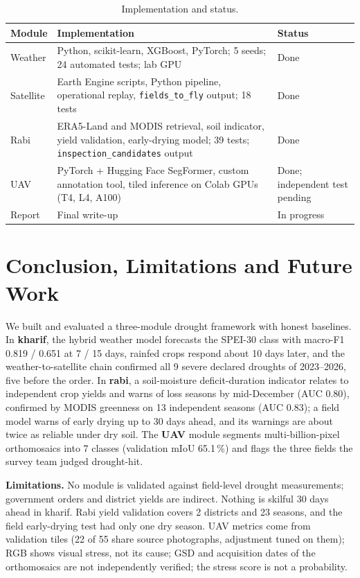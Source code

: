 \documentclass[11pt,a4paper,oneside]{article}
\newcommand{\mf}{macro-F1}
\begin{document}
\begin{table}[!htbp]
\centering
\caption{Implementation and status.}
\label{tab:status}
\scriptsize
\begin{tabularx}{\textwidth}{@{}p{2.6cm}Yp{1.6cm}@{}}
\toprule
\textbf{Module} & \textbf{Implementation} & \textbf{Status} \\
\midrule
Weather & Python, scikit-learn, XGBoost, PyTorch; 5 seeds; 24 automated tests; lab GPU & Done \\
Satellite & Earth Engine scripts, Python pipeline, operational replay, \texttt{fields\_to\_fly} output; 18 tests & Done \\
Rabi & ERA5-Land and MODIS retrieval, soil indicator, yield validation, early-drying model; 39 tests; \texttt{inspection\_candidates} output & Done \\
UAV & PyTorch + Hugging Face SegFormer, custom annotation tool, tiled inference on Colab GPUs (T4, L4, A100) & Done; independent test pending \\
Report & Final write-up & In progress \\
\bottomrule
\end{tabularx}
\end{table}

\section{Conclusion, Limitations and Future Work}
We built and evaluated a three-module drought framework with honest baselines. In \textbf{kharif}, the hybrid weather model forecasts the SPEI-30 class with \mf{} 0.819 / 0.651 at 7 / 15 days, rainfed crops respond about 10 days later, and the weather-to-satellite chain confirmed all 9 severe declared droughts of 2023--2026, five before the order. In \textbf{rabi}, a soil-moisture deficit-duration indicator relates to independent crop yields and warns of loss seasons by mid-December (AUC 0.80), confirmed by MODIS greenness on 13 independent seasons (AUC 0.83); a field model warns of early drying up to 30 days ahead, and its warnings are about twice as reliable under dry soil. The \textbf{UAV} module segments multi-billion-pixel orthomosaics into 7 classes (validation mIoU 65.1\,\%) and flags the three fields the survey team judged drought-hit.

\textbf{Limitations.} No module is validated against field-level drought measurements; government orders and district yields are indirect. Nothing is skilful 30 days ahead in kharif. Rabi yield validation covers 2 districts and 23 seasons, and the field early-drying test had only one dry season. UAV metrics come from validation tiles (22 of 55 share source photographs, adjustment tuned on them); RGB shows visual stress, not its cause; GSD and acquisition dates of the orthomosaics are not independently verified; the stress score is not a probability.
\end{document}
